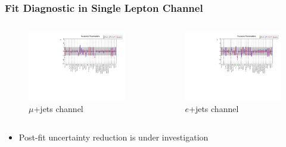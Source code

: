 \documentclass{beamer}
\begin{document}

\begin{frame}
\frametitle{Fit Diagnostic in Single Lepton Channel}
\begin{columns}
\begin{figure}
\includegraphics[width=\textwidth]{large_stat/mu/pulls}\caption{$\mu$+jets channel}
\end{figure}
\begin{figure}
\includegraphics[width=\textwidth]{large_stat/el/pulls}\caption{$e$+jets channel}
\end{figure}
\end{columns}
	\begin{itemize}
	\item Post-fit uncertainty reduction is under investigation
	\end{itemize}
\end{frame}
\end{document}
